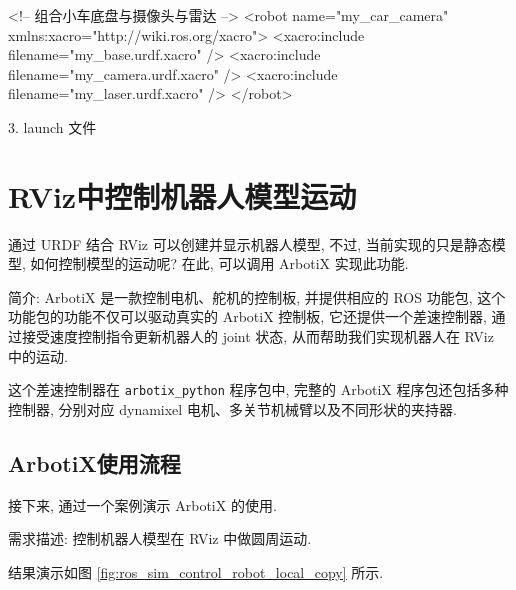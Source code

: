 \documentclass[openany, fontset=windowsold]{ctexbook}
\theoremstyle{kaiti}
\theoremstyle{normal}
\begin{document}
\begin{xml}
  <!-- 组合小车底盘与摄像头与雷达 -->
  <robot name="my_car_camera" xmlns:xacro="http://wiki.ros.org/xacro">
      <xacro:include filename="my_base.urdf.xacro" />
      <xacro:include filename="my_camera.urdf.xacro" />
      <xacro:include filename="my_laser.urdf.xacro" />
  </robot>
\end{xml}

3. launch 文件


\section{RViz中控制机器人模型运动}

通过 URDF 结合 RViz 可以创建并显示机器人模型, 不过, 当前实现的只是静态模型, 如何控制模型的运动呢? 在此, 可以调用 ArbotiX 实现此功能.

简介: ArbotiX 是一款控制电机、舵机的控制板, 并提供相应的 ROS 功能包, 这个功能包的功能不仅可以驱动真实的 ArbotiX 控制板, 它还提供一个差速控制器, 通过接受速度控制指令更新机器人的 joint 状态, 从而帮助我们实现机器人在 RViz 中的运动.

这个差速控制器在 \verb|arbotix_python| 程序包中, 完整的 ArbotiX 程序包还包括多种控制器, 分别对应 dynamixel 电机、多关节机械臂以及不同形状的夹持器.

\subsection{ArbotiX使用流程}

接下来, 通过一个案例演示 ArbotiX 的使用.

需求描述: 控制机器人模型在 RViz 中做圆周运动.

结果演示如图 \ref{fig:ros_sim_control_robot_local_copy} 所示.
\end{document}
